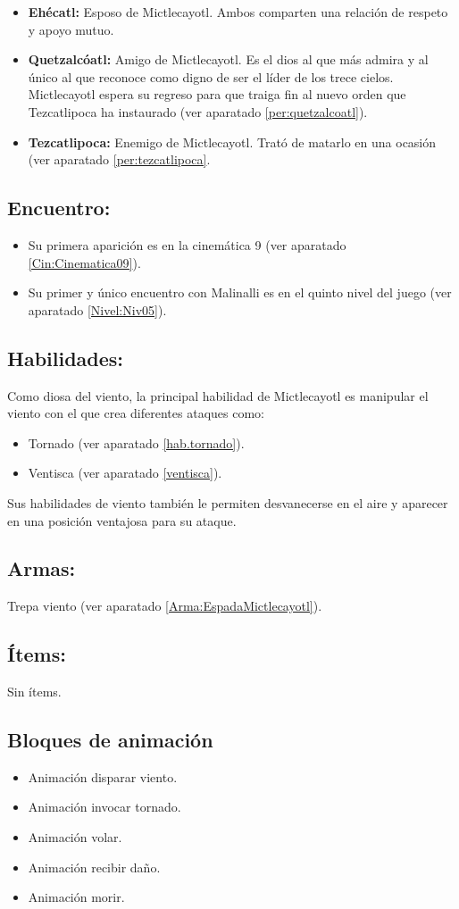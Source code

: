 \begin{itemize}
\begin{itemize}
		\item \textbf{Ehécatl:} Esposo de Mictlecayotl. Ambos comparten una relación de respeto y apoyo mutuo. 
		
		\item \textbf{Quetzalcóatl:} Amigo de Mictlecayotl. Es el dios al que más admira y al único al que reconoce como digno de ser el líder de los trece cielos. Mictlecayotl espera su regreso para que traiga fin al nuevo orden que Tezcatlipoca ha instaurado (ver aparatado \ref{per:quetzalcoatl}).
		
		\item \textbf{Tezcatlipoca:} Enemigo de Mictlecayotl. Trató de matarlo en una ocasión (ver aparatado \ref{per:tezcatlipoca}.  
	\end{itemize}			  
\end{itemize}


\subsection{Encuentro:}
\begin{itemize}
	\item Su primera aparición es en la cinemática 9 (ver aparatado \ref{Cin:Cinematica09}). 
	\item Su primer y único encuentro con Malinalli es en el quinto nivel del juego (ver aparatado \ref{Nivel:Niv05}).
\end{itemize}
\subsection{Habilidades:}
Como diosa del viento, la principal habilidad de Mictlecayotl es manipular el viento con el que crea diferentes ataques como:
\begin{itemize}
	\item Tornado (ver aparatado \ref{hab.tornado}).
	\item Ventisca (ver aparatado \ref{ventisca}).
\end{itemize}

Sus habilidades de viento también le permiten desvanecerse en el aire y aparecer en una posición ventajosa para su ataque.
\subsection{Armas:}
Trepa viento (ver aparatado \ref{Arma:EspadaMictlecayotl}).
\subsection{Ítems:}
Sin ítems.
\subsection{Bloques de animación}
	\begin{itemize}
		\item Animación disparar viento.
		\item Animación invocar tornado.
		\item Animación volar.
		\item Animación recibir daño.
		\item Animación morir.
	\end{itemize} 